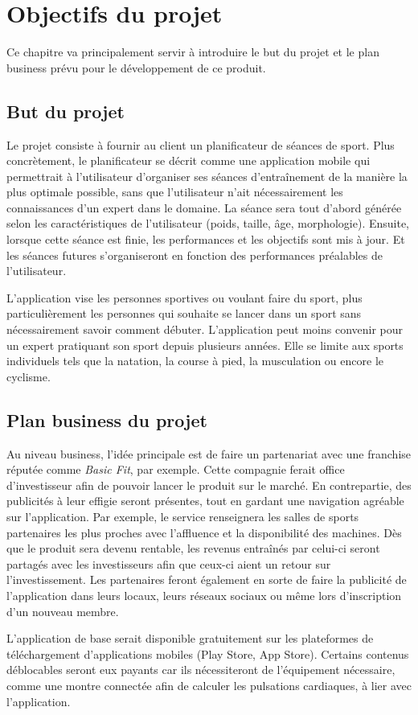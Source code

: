 \chapter{Objectifs du projet}

Ce chapitre va principalement servir à introduire le but du projet et le plan business prévu pour le développement de ce produit.

\section{But du projet}

Le projet consiste à fournir au client un planificateur de séances de sport. Plus concrètement, le planificateur se décrit comme une application mobile qui permettrait à l'utilisateur d'organiser ses séances d'entraînement de la manière la plus optimale possible, sans que l'utilisateur n'ait nécessairement les connaissances d'un expert dans le domaine. La séance sera tout d'abord générée selon les caractéristiques de l'utilisateur (poids, taille, âge, morphologie). Ensuite, lorsque cette séance est finie, les performances et les objectifs sont mis à jour. Et les séances futures s'organiseront en fonction des performances préalables de l'utilisateur. 

L'application vise les personnes sportives ou voulant faire du sport, plus particulièrement les personnes qui souhaite se lancer dans un sport sans nécessairement savoir comment débuter. L'application peut moins convenir pour un expert pratiquant son sport depuis plusieurs années. Elle se limite aux sports individuels tels que la natation, la course à pied, la musculation ou encore le cyclisme. 

\section{Plan business du projet}

Au niveau business, l'idée principale est de faire un partenariat avec une franchise réputée comme \textit{Basic Fit}, par exemple. Cette compagnie ferait office d'investisseur afin de pouvoir lancer le produit sur le marché. En contrepartie, des publicités à leur effigie seront présentes, tout en gardant une navigation agréable sur l'application. Par exemple, le service renseignera les salles de sports partenaires les plus proches avec l'affluence et la disponibilité des machines. Dès que le produit sera devenu rentable, les revenus entraînés par celui-ci seront partagés avec les investisseurs afin que ceux-ci aient un retour sur l'investissement. Les partenaires feront également en sorte de faire la publicité de l'application dans leurs locaux, leurs réseaux sociaux ou même lors d'inscription d'un nouveau membre.

L'application de base serait disponible gratuitement sur les plateformes de téléchargement d'applications mobiles (Play Store, App Store). Certains contenus déblocables seront eux payants car ils nécessiteront de l'équipement nécessaire, comme une montre connectée afin de calculer les pulsations cardiaques, à lier avec l'application.